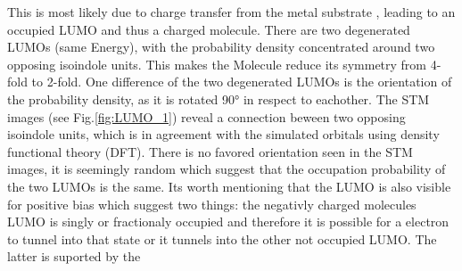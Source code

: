 \noindent This is most likely due to charge transfer from the metal substrate , leading to an occupied LUMO and thus a charged molecule.  
There are two degenerated LUMOs (same Energy), with the probability density concentrated around two opposing isoindole units. 
This makes the Molecule reduce its symmetry from 4-fold to 2-fold.
One difference of the two degenerated LUMOs is the orientation of the probability density, as it is rotated 90° in respect to eachother.
The STM images (see Fig.\ref{fig:LUMO_1}) reveal a connection beween two opposing isoindole units, which is in agreement  with the simulated orbitals using density functional theory (DFT).  
There is no favored orientation seen in the STM images, it is seemingly random which suggest that the occupation probability of the two LUMOs is the same. 
Its worth mentioning that the LUMO is also visible for positive bias which suggest two things: the negativly charged molecules LUMO is singly or fractionaly occupied and therefore it is possible for a electron to tunnel into that state or it tunnels into the other not occupied LUMO. The latter is suported by the 
